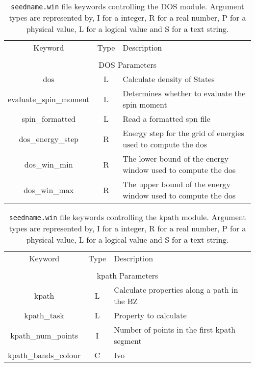 \begin{table}[hH!]
\begin{center}
\begin{tabular}{|c|c|p{6cm}|}
\hline
Keyword & Type & Description \\
        &      &             \\
\hline\hline
\multicolumn{3}{|c|}{DOS Parameters} \\
\hline
{\sc dos}  & L & Calculate density of States \\
{\sc evaluate\_spin\_moment}& L & Determines whether to evaluate the spin moment\\
{\sc spin\_formatted}& L & Read a formatted spn file\\
{\sc dos\_energy\_step}& R & Energy step for the grid of energies
used to compute the dos\\
{\sc dos\_win\_min} & R & The lower bound of the energy window used
to compute the dos\\
{\sc dos\_win\_max}& R & The upper bound of the energy window used
to compute the dos\\
\hline
\end{tabular}
\caption[Parameter file keywords controlling the DOS module.]
{{\tt seedname.win} file keywords controlling the DOS module. Argument types
are represented by, I for a integer, R for a real number, P for a
physical value, L for a logical value and S for a text string.}
\label{parameter_keywords_dos}
\end{center}
\end{table}


\begin{table}[hH!]
\begin{center}
\begin{tabular}{|c|c|p{6cm}|}
\hline
Keyword & Type & Description \\
        &      &             \\
\hline\hline
\multicolumn{3}{|c|}{kpath Parameters} \\
\hline
{\sc kpath}  & L & Calculate properties along a path in the BZ \\
{\sc kpath\_task}& L & Property to calculate\\
{\sc kpath\_num\_points}& I & Number of points in the first kpath segment\\
{\sc kpath\_bands\_colour}& C & Ivo\\
\hline
\end{tabular}
\caption[Parameter file keywords controlling the kpath module.]
{{\tt seedname.win} file keywords controlling the kpath module. Argument types
are represented by, I for a integer, R for a real number, P for a
physical value, L for a logical value and S for a text string.}
\label{parameter_keywords_kpath}
\end{center}
\end{table}

